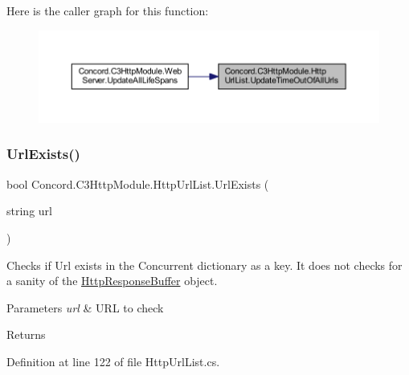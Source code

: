Here is the caller graph for this function\+:
\nopagebreak
\begin{figure}[H]
\begin{center}
\leavevmode
\includegraphics[width=350pt]{class_concord_1_1_c3_http_module_1_1_http_url_list_ac7cb0246fc6be60e897fc560bbf1fd13_icgraph}
\end{center}
\end{figure}
\mbox{\label{class_concord_1_1_c3_http_module_1_1_http_url_list_a827cc894faba7a6e238d2c88d5f713a4}} 
\subsubsection{\texorpdfstring{UrlExists()}{UrlExists()}}
{\footnotesize\ttfamily bool Concord.\+C3\+Http\+Module.\+Http\+Url\+List.\+Url\+Exists (\begin{DoxyParamCaption}\item[{string}]{url }\end{DoxyParamCaption})\hspace{0.3cm}{\ttfamily [inline]}}



Checks if Url exists in the Concurrent dictionary as a key. It does not checks for a sanity of the \mbox{\hyperlink{class_concord_1_1_c3_http_module_1_1_http_response_buffer}{Http\+Response\+Buffer}} object. 


\begin{DoxyParams}{Parameters}
{\em url} & U\+RL to check\\
\hline
\end{DoxyParams}
\begin{DoxyReturn}{Returns}

\end{DoxyReturn}


Definition at line 122 of file Http\+Url\+List.\+cs.



